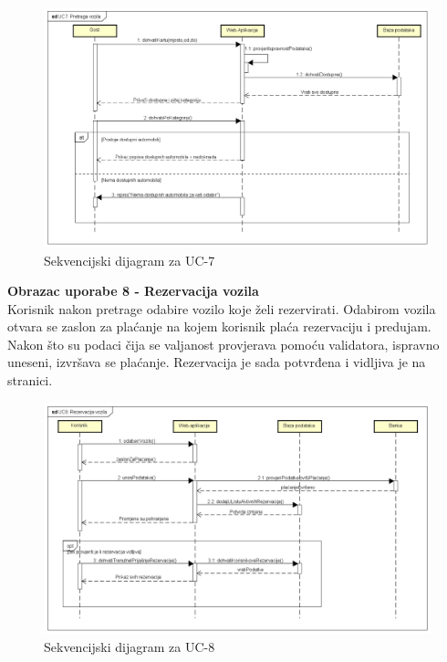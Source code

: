				\begin{figure}[hp]
                    \centering
                    \includegraphics[width=16cm]{slike/UC7_Pretraga_vozila.png}
                    \caption{Sekvencijski dijagram za UC-7}
                    \label{fig:SD_UC7}
                \end{figure}
                
                \newpage\noindent\textbf{Obrazac uporabe 8 - Rezervacija vozila}\\
                
                \noindent Korisnik nakon pretrage odabire vozilo koje želi rezervirati. Odabirom vozila otvara se zaslon za plaćanje na kojem korisnik plaća rezervaciju i predujam. Nakon što su podaci čija se valjanost provjerava pomoću validatora, ispravno uneseni, izvršava se plaćanje. Rezervacija je sada potvrđena i vidljiva je na stranici.
                
                \begin{figure}[hp]
                    \centering
                    \includegraphics[width=16cm]{slike/UC8_Rezervacija_vozila.png}
                    \caption{Sekvencijski dijagram za UC-8}
                    \label{fig:SD_UC8}
                \end{figure}
                
